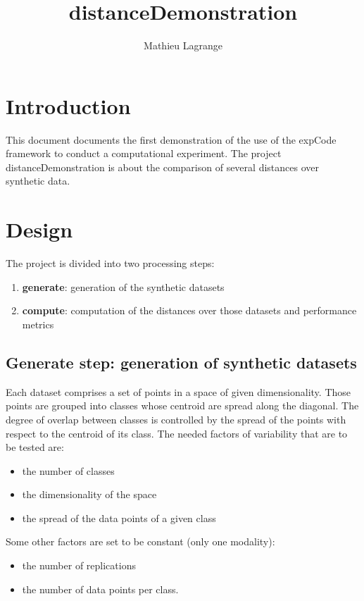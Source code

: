 \documentclass[12pt,a4paper,fleqn]{tufte-handout}
\title{distanceDemonstration}
\author{ Mathieu Lagrange }
\begin{document}
 
  
\maketitle 
  

\section{Introduction}

This document documents the first demonstration of the use of the expCode framework to conduct a computational experiment. The project distanceDemonstration is about the comparison of several distances over synthetic data.



\section{Design}

 The project is divided into two processing steps:
\begin{enumerate}
\item \textbf{generate}: generation of the synthetic datasets
\item \textbf{compute}: computation of the distances over those datasets and performance metrics
\end{enumerate}

\subsection{\textbf{Generate step}: generation of synthetic datasets}

Each dataset comprises a set of points in a space of given dimensionality. Those points are grouped into classes whose centroid are spread along the diagonal. The degree of overlap between classes is controlled by the spread of the points with respect to the centroid of its class. The needed factors of variability that are to be tested are:
\begin{itemize}
\item the number of classes
\item the dimensionality of the space
\item the spread of the data points of a given class
\end{itemize}
Some other factors are set to be constant (only one modality):
\begin{itemize}
\item the number of replications
\item the number of data points per class.
\end{itemize}
\end{document}
